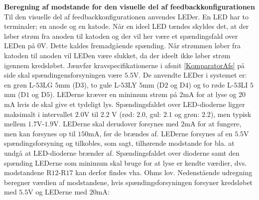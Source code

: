 \noindent\textbf{Beregning af modstande for den visuelle del af feedbackkonfigurationen} \\
Til den visuelle del af feedbackkonfigurationen anvendes LEDer. En LED har to terminaler; en anode og en katode. Når en ideel LED tændes skyldes det, at der løber strøm fra anoden til katoden og der vil her være et spændingsfald over LEDen på $0$V. Dette kaldes fremadgående spænding. Når strømmen løber fra katoden til anoden vil LEDen være slukket, da der ideelt ikke løber strøm igennem kredsløbet.\cite{Sedra2010} Jænvfør kravspecifikationerne i afsnit \ref{KomparatorAfs} på side \pageref{KomparatorAfs} skal spændingensforsyningen være $5.5$V. De anvendte LEDer i systemet er: en grøn L-$53$LG $5$mm (D$3$), to gule L-$53$LY $5$mm (D$2$ og D$4$) og to røde L-$53$LI $5$mm (D$1$ og D$5$). LEDerne kræver en minimum strøm på $2$mA for at lyse og $20$mA hvis de skal give et tydeligt lys.  Spændingsfaldet over LED-dioderne ligger maksimalt i intervallet $2.0$V til $2.2$ V (rød: $2.0$, gul: $2.1$ og grøn: $2.2$), men typisk mellem $1.7$V-$1.9$V. LEDerne skal derudover forsynes med $2$mA for at fungere, men kan forsynes op til $150$mA, før de brændes af. LEDerne forsynes af en $5.5$V spændingsforsyning og tilkobles, som sagt, tilhørende modstande for bla. at undgå at LED-dioderne brænder af. \cite{kingbright} Spændingsfaldet over dioderne samt den spænding LEDerne som minimum skal bruge for at lyse er kendte værdier, dvs. modstandene R$12$-R$17$ kan derfor findes vha. Ohms lov. Nedenstående udregning beregner værdien af modstandene, hvis spændingsforsyningen forsyner kredsløbet med $5.5$V og LEDerne med $20$mA:


